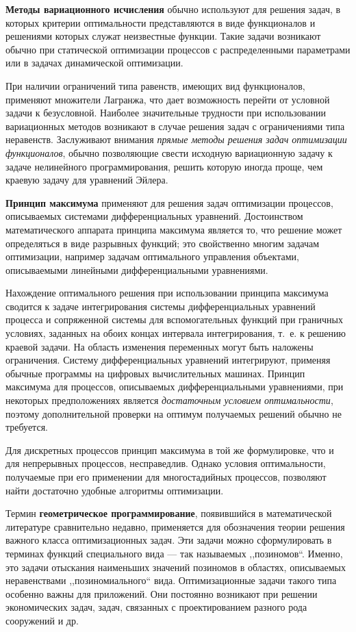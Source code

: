 \textbf{Методы вариационного исчисления} обычно используют для решения задач, в
которых критерии оптимальности представляются в виде функционалов и
решениями которых служат неизвестные функции. Такие задачи возникают
обычно при статической оптимизации процессов с распределенными
параметрами или в задачах динамической оптимизации.

При наличии ограничений типа равенств, имеющих вид функционалов,
применяют множители Лагранжа, что дает возможность перейти от условной
задачи к безусловной. Наиболее значительные трудности при
использовании вариационных методов возникают в случае решения задач с
ограничениями типа неравенств. Заслуживают внимания \textsl{прямые методы
решения задач оптимизации функционалов}, обычно позволяющие свести
исходную вариационную задачу к задаче нелинейного программирования,
решить которую иногда проще, чем краевую задачу для уравнений Эйлера.

\textbf{Принцип максимума} применяют для решения задач оптимизации процессов,
описываемых системами дифференциальных уравнений. Достоинством
математического аппарата принципа максимума является то, что решение
может определяться в виде разрывных функций; это свойственно многим
задачам оптимизации, например задачам оптимального управления
объектами, описываемыми линейными дифференциальными уравнениями.

Нахождение оптимального решения при использовании принципа максимума
сводится к задаче интегрирования системы дифференциальных уравнений
процесса и сопряженной системы для вспомогательных функций при
граничных условиях, заданных на обоих концах интервала интегрирования,
т.~е. к решению краевой задачи. На область изменения переменных могут
быть наложены ограничения. Систему дифференциальных уравнений
интегрируют, применяя обычные программы на цифровых вычислительных
машинах.  Принцип максимума для процессов, описываемых
дифференциальными уравнениями, при некоторых предположениях является
\textsl{достаточным условием оптимальности}, поэтому дополнительной проверки на
оптимум получаемых решений обычно не требуется. 

Для дискретных процессов принцип максимума в той же формулировке, что и для
непрерывных процессов, несправедлив. Однако условия оптимальности,
получаемые при его применении для многостадийных процессов, позволяют
найти достаточно удобные алгоритмы оптимизации.

Термин \textbf{геометрическое программирование}, появившийся в
математической литературе сравнительно недавно, применяется для
обозначения теории решения важного класса оптимизационных задач. Эти
задачи можно сформулировать в терминах функций специального вида --- так
называемых ,,позиномов``. Именно, это задачи отыскания наименьших
значений позиномов в областях, описываемых неравенствами
,,позиномиального`` вида. Оптимизационные задачи такого типа особенно
важны для приложений. Они постоянно возникают при решении
экономических задач, задач, связанных с проектированием разного рода
сооружений и др. 

